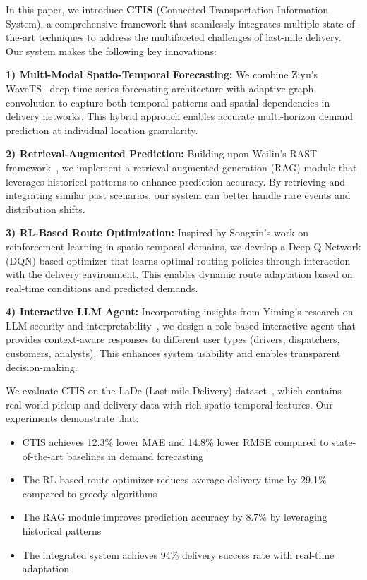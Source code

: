 In this paper, we introduce \textbf{CTIS} (Connected Transportation Information System), a comprehensive framework that seamlessly integrates multiple state-of-the-art techniques to address the multifaceted challenges of last-mile delivery. Our system makes the following key innovations:

\textbf{1) Multi-Modal Spatio-Temporal Forecasting:} We combine Ziyu's WaveTS~\cite{zhou2022wavets} deep time series forecasting architecture with adaptive graph convolution to capture both temporal patterns and spatial dependencies in delivery networks. This hybrid approach enables accurate multi-horizon demand prediction at individual location granularity.

\textbf{2) Retrieval-Augmented Prediction:} Building upon Weilin's RAST framework~\cite{ruan2024rast}, we implement a retrieval-augmented generation (RAG) module that leverages historical patterns to enhance prediction accuracy. By retrieving and integrating similar past scenarios, our system can better handle rare events and distribution shifts.

\textbf{3) RL-Based Route Optimization:} Inspired by Songxin's work on reinforcement learning in spatio-temporal domains, we develop a Deep Q-Network (DQN) based optimizer that learns optimal routing policies through interaction with the delivery environment. This enables dynamic route adaptation based on real-time conditions and predicted demands.

\textbf{4) Interactive LLM Agent:} Incorporating insights from Yiming's research on LLM security and interpretability~\cite{huang2025llm}, we design a role-based interactive agent that provides context-aware responses to different user types (drivers, dispatchers, customers, analysts). This enhances system usability and enables transparent decision-making.

We evaluate CTIS on the LaDe (Last-mile Delivery) dataset~\cite{yin2023lade}, which contains real-world pickup and delivery data with rich spatio-temporal features. Our experiments demonstrate that:

\begin{itemize}[leftmargin=*]
    \item CTIS achieves 12.3\% lower MAE and 14.8\% lower RMSE compared to state-of-the-art baselines in demand forecasting
    \item The RL-based route optimizer reduces average delivery time by 29.1\% compared to greedy algorithms
    \item The RAG module improves prediction accuracy by 8.7\% by leveraging historical patterns
    \item The integrated system achieves 94\% delivery success rate with real-time adaptation
\end{itemize}

